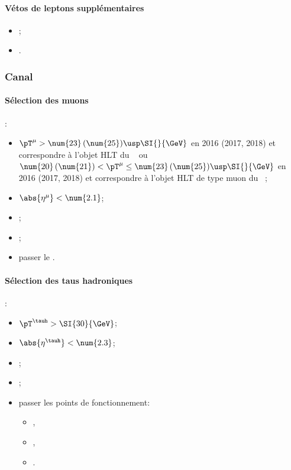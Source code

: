 \paragraph{Vétos de leptons supplémentaires}
\LeptonVetoes
\begin{itemize}
    \item \LeptonVetoesExtraMuon;
    \item \LeptonVetoesExtraEle.
\end{itemize}

\subsubsection{Canal \mu\tauh}\label{chapter-HTT_analysis-section-offline-mt}
\paragraph{Sélection des muons}
:
\begin{itemize}
    \item $\pT^{\mu} > \num{23} \, (\num{25}) \usp \SI{}{\GeV}$ en 2016 (2017, 2018) et correspondre à l'objet HLT du \HLTpath\ \HLTSingleMu{} ou $\num{20} \, (\num{21}) < \pT^{\mu} \leq \num{23} \, (\num{25}) \usp \SI{}{\GeV}$ en 2016 (2017, 2018) et correspondre à l'objet HLT de type muon du \HLTpath\ \HLTMuTauCross{};
    \item $\abs{\eta^{\mu}} < \num{2.1}$;
    \item \Leptondzdxy;
    \item {};
    \item passer le \MediumMuonID.
\end{itemize}
\paragraph{Sélection des taus hadroniques}
:
\begin{itemize}
    \item $\pT^{\tauh} > \SI{30}{\GeV}$;
    \item $\abs{\eta^{\tauh}} < \num{2.3}$;
    \item \TauHdz;
    \item \NewDecayModeFinding;
    \item passer les points de fonctionnement:
        \begin{itemize}
            \item {},
            \item {},
            \item {}.
        \end{itemize}
\end{itemize}
